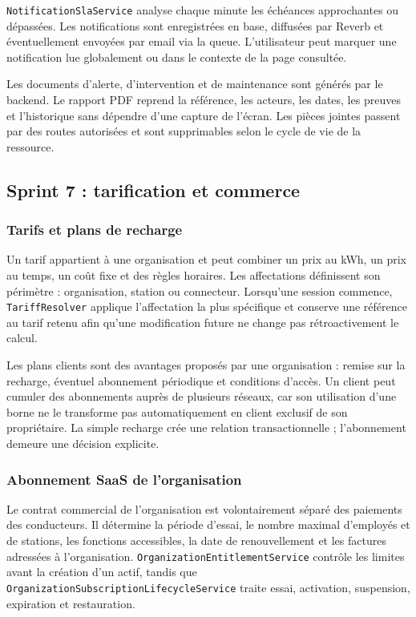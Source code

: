 \texttt{NotificationSlaService} analyse chaque minute les échéances approchantes
ou dépassées. Les notifications sont enregistrées en base, diffusées par Reverb
et éventuellement envoyées par email via la queue. L'utilisateur peut marquer
une notification lue globalement ou dans le contexte de la page consultée.

Les documents d'alerte, d'intervention et de maintenance sont générés par le
backend. Le rapport PDF reprend la référence, les acteurs, les dates, les preuves
et l'historique sans dépendre d'une capture de l'écran. Les pièces jointes passent
par des routes autorisées et sont supprimables selon le cycle de vie de la
ressource.

\subsection{Sprint 7 : tarification et commerce}

\subsubsection{Tarifs et plans de recharge}

Un tarif appartient à une organisation et peut combiner un prix au kWh, un prix
au temps, un coût fixe et des règles horaires. Les affectations définissent son
périmètre : organisation, station ou connecteur. Lorsqu'une session commence,
\texttt{TariffResolver} applique l'affectation la plus spécifique et conserve une
référence au tarif retenu afin qu'une modification future ne change pas
rétroactivement le calcul.

Les plans clients sont des avantages proposés par une organisation : remise sur
la recharge, éventuel abonnement périodique et conditions d'accès. Un client peut
cumuler des abonnements auprès de plusieurs réseaux, car son utilisation d'une
borne ne le transforme pas automatiquement en client exclusif de son propriétaire.
La simple recharge crée une relation transactionnelle ; l'abonnement demeure une
décision explicite.

\subsubsection{Abonnement SaaS de l'organisation}

Le contrat commercial de l'organisation est volontairement séparé des paiements
des conducteurs. Il détermine la période d'essai, le nombre maximal d'employés et
de stations, les fonctions accessibles, la date de renouvellement et les factures
adressées à l'organisation. \texttt{OrganizationEntitlementService} contrôle les
limites avant la création d'un actif, tandis que
\texttt{OrganizationSubscriptionLifecycleService} traite essai, activation,
suspension, expiration et restauration.

